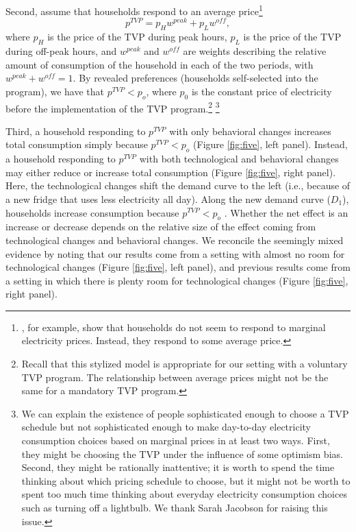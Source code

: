 \documentclass[12pt]{article}
\begin{document}

Second, assume that households respond to an average price\footnote{ \citet{itoConsumersRespondMarginal2014}, for example, show that households do not seem to respond to marginal electricity prices. Instead, they respond to some average price.}
\begin{equation}
	p^{TVP} = p_{H} w^{peak} + p_{L} w^{off},
\end{equation}
where $p_{H}$ is the price of the TVP during peak hours, $p_{L}$ is the price of the TVP during off-peak hours, and $w^{peak}$ and $w^{off}$ are weights describing the relative amount of consumption of the household in each of the two periods, with $w^{peak} + w^{off} = 1$. By revealed preferences (households self-selected into the program), we have that $p^{TVP} < p_{o}$, where $p_{0}$ is the constant price of electricity before the implementation of the TVP program.\footnote{Recall that this stylized model is appropriate for our setting with a voluntary TVP program. The relationship between average prices might not be the same for a mandatory TVP program.} \footnote{We can explain the existence of people sophisticated enough to choose a TVP schedule but not sophisticated enough to make day-to-day electricity consumption choices based on marginal prices in at least two ways. First, they might be choosing the TVP under the influence of some optimism bias. Second, they might be rationally inattentive; it is worth to spend the time thinking about which pricing schedule to choose, but it might not be worth to spent too much time thinking about everyday electricity consumption choices such as turning off a lightbulb. We thank Sarah Jacobson for raising this issue.}

Third, a household responding to $p^{TVP}$ with only behavioral changes increases total consumption simply because $p^{TVP} <p_{o}$ (Figure \ref{fig:five}, left panel). Instead, a household responding to $p^{TVP}$ with both technological and behavioral changes may either reduce or increase total consumption (Figure \ref{fig:five}, right panel). Here, the technological changes shift the demand curve to the left (i.e., because of a new fridge that uses less electricity all day). Along the new demand curve ($D_{1}$), households increase consumption because $p^{TVP} < p_{o}$ . Whether the net effect is an increase or decrease depends on the relative size of the effect coming from technological changes and behavioral changes. We reconcile the seemingly mixed evidence by noting that our results come from a setting with almost no room for technological changes (Figure \ref{fig:five}, left panel), and previous results come from a setting in which there is plenty room for technological changes (Figure \ref{fig:five}, right panel).
\end{document}
